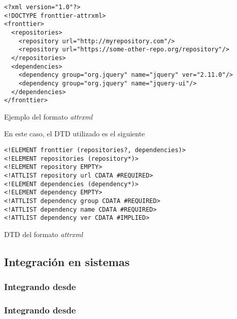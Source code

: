 \begin{listing}[ht]
\begin{verbatim}
<?xml version="1.0"?>
<!DOCTYPE fronttier-attrxml>
<fronttier>
  <repositories>
    <repository url="http://myrepository.com"/>
    <repository url="https://some-other-repo.org/repository"/>
  </repositories>	
  <dependencies>
    <dependency group="org.jquery" name="jquery" ver="2.11.0"/>
    <dependency group="org.jquery" name="jquery-ui"/>
  </dependencies>
</fronttier>
\end{verbatim}
\caption{Ejemplo del formato \emph{attrxml}}
\label{guide:attrxml:sample}
\end{listing}
En este caso, el DTD utilizado es el siguiente
\begin{listing}[ht]
\begin{verbatim}
<!ELEMENT fronttier (repositories?, dependencies)>
<!ELEMENT repositories (repository*)>
<!ELEMENT repository EMPTY>
<!ATTLIST repository url CDATA #REQUIRED>
<!ELEMENT dependencies (dependency*)>
<!ELEMENT dependency EMPTY>
<!ATTLIST dependency group CDATA #REQUIRED>
<!ATTLIST dependency name CDATA #REQUIRED>
<!ATTLIST dependency ver CDATA #IMPLIED>
\end{verbatim}
\caption{DTD del formato \emph{attrxml}}
\label{guide:attrxml:dtd}
\end{listing}
\subsection{Integración en sistemas}
\label{subsec:guide:systems}

\subsubsection{Integrando desde \scala}
\label{subsubsec:guide:systems:scala}

\subsubsection{Integrando desde \java}
\label{subsubsec:guide:system:java}